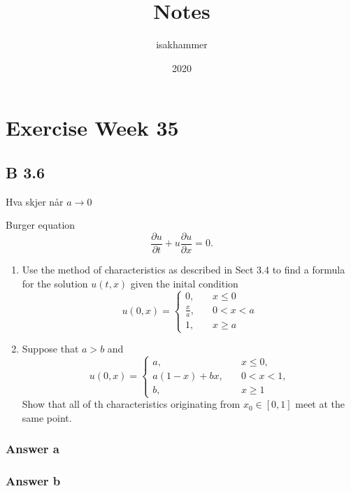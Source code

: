 \documentclass{article}
\title{Notes}
\author{isakhammer }
\date{2020}
\theoremstyle{remark}
\begin{document}
\maketitle
\tableofcontents
\newpage

\newpage
\section{Exercise Week 35}%
\label{sec:exercise_1}

\subsection{B 3.6}%
\label{sub:b_3_6}
\begin{tcolorbox}
Hva skjer når $a\to 0$
\end{tcolorbox}


 Burger equation 
 \begin{equation}
 \label{eq:burger}
 \frac{\partial u}{\partial t}  + u \frac{\partial u}{\partial x} = 0
 .\end{equation}

 \begin{enumerate}[label=(\alph*)]
   \item Use the method of characteristics as described in Sect 3.4 to find a formula for the solution $u\left( t,x \right)$ given the inital condition \[
   u\left( 0, x \right) = \begin{cases}
     0,  &  \quad x\le 0\\
     \frac{x}{a} ,  &  \quad  0 < x < a \\
     1, &  \quad    x\ge a
   \end{cases}
   \] 
  \item Suppose that $a > b$ and \[
  u\left( 0,x \right) = \begin{cases}
    a,  &  \quad  x\le 0, \\
    a\left( 1-x \right) + bx ,  &  \quad    0 < x < 1, \\
    b,  &  \quad  x\ge 1 
  \end{cases}
  \] 
  Show that all of th characteristics originating from $x_{0} \in  \left[ 0,1 \right]$ meet at the same point.
 \end{enumerate}

 \subsubsection{Answer a}%
 \label{ssub:answer_a}
 
 \subsubsection{Answer b}%
 \label{ssub:answer_a}
 
\end{document}
